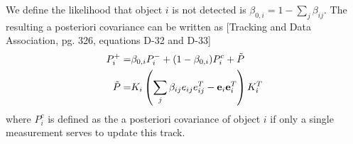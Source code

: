 \documentclass[10pt]{article}
\newcommand{\bracket}[1]{\ensuremath{\left[ #1 \right]}}
\newcommand{\tr}[1]{\mathrm{tr}\ensuremath{\negthickspace\bracket{#1}}}
\theoremstyle{plain}\theorembodyfont{\normalfont}
\begin{document}
We define the likelihood that object $i$ is not detected is $\beta_{0,i}=1-{\sum\limits_{j} \beta_{ij}}$. The resulting a posteriori covariance can be written as [Tracking and Data Association, pg. 326, equations D-32 and D-33]
\begin{align}
\label{eqn:JPDAFCov}
P^+_{i}=& \beta_{0,i}P^-_{i}+(1-\beta_{0,i})P_i^c+\tilde P
\\
\tilde P=&K_i\left({\sum\limits_{j} \beta_{ij}e_{ij}e_{ij}^T-{\bf{e}}_{i}}{\bf{e}}_{i}^T\right)K_{i}^T\label{eqn:tildeP}
\end{align}
where $P_i^c$ is defined as the a posteriori covariance of object $i$ if only a single measurement serves to update this track.
\end{document}
